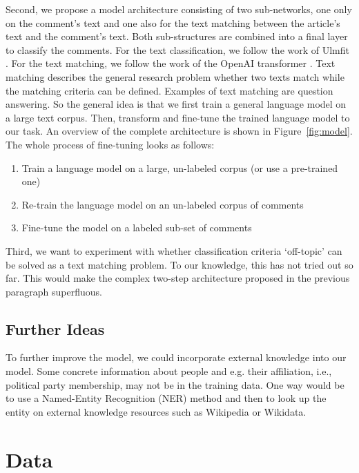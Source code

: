 Second, we propose a model architecture consisting of two sub-networks, one only on the comment's text and one also for the text matching between the article's text and the comment's text. Both sub-structures are combined into a final layer to classify the comments. For the text classification, we follow the work of Ulmfit \cite{howard_universal_2018}. For the text matching, we follow the work of the OpenAI transformer \cite{radford2018improving}.  Text matching describes the general research problem whether two texts match while the matching criteria can be defined. Examples of text matching are question answering. So the general idea is that we first train a general language model on a large text corpus. Then, transform and fine-tune the trained language model to our task. An overview of the complete architecture is shown in Figure~\ref{fig:model}. The whole process of fine-tuning looks as follows:

\begin{enumerate}
   \item Train a language model on a large, un-labeled corpus (or use a pre-trained one)
   \item Re-train the language model on an un-labeled corpus of comments
   \item Fine-tune the model on a labeled sub-set of comments
 \end{enumerate}
 
Third, we want to experiment with whether classification criteria `off-topic' can be solved as a text matching problem. To our knowledge, this has not tried out so far. This would make the complex two-step architecture proposed in the previous paragraph superfluous.

\newpage

\subsection{Further Ideas}

To further improve the model, we could incorporate external knowledge into our model. Some concrete information about people and e.g. their affiliation, i.e., political party membership, may not be in the training data. One way would be to use a Named-Entity Recognition (NER) method and then to look up the entity on external knowledge resources such as Wikipedia or Wikidata.


\section{Data}

